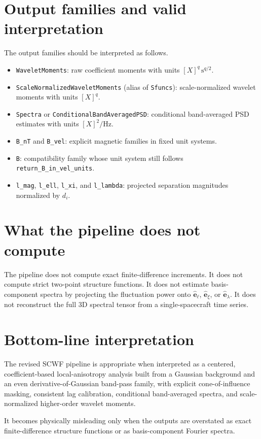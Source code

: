 \documentclass[11pt]{article}
\begin{document}
\section{Output families and valid interpretation}

The output families should be interpreted as follows.
\begin{itemize}[leftmargin=1.6em,itemsep=0.35em]
\item \texttt{WaveletMoments}: raw coefficient moments with units $[X]^q\,\mathrm{s}^{q/2}$.
\item \texttt{ScaleNormalizedWaveletMoments} (alias of \texttt{Sfuncs}): scale-normalized wavelet moments with units $[X]^q$.
\item \texttt{Spectra} or \texttt{ConditionalBandAveragedPSD}: conditional band-averaged PSD estimates with units $[X]^2/\mathrm{Hz}$.
\item \texttt{B\_nT} and \texttt{B\_vel}: explicit magnetic families in fixed unit systems.
\item \texttt{B}: compatibility family whose unit system still follows \texttt{return\_B\_in\_vel\_units}.
\item \texttt{l\_mag}, \texttt{l\_ell}, \texttt{l\_xi}, and \texttt{l\_lambda}: projected separation magnitudes normalized by $d_i$.
\end{itemize}

\section{What the pipeline does not compute}

The pipeline does not compute exact finite-difference increments. It does not compute
strict two-point structure functions. It does not estimate basis-component spectra by
projecting the fluctuation power onto $\hat{\mathbf{e}}_{\ell}$, $\hat{\mathbf{e}}_{\xi}$,
or $\hat{\mathbf{e}}_{\lambda}$. It does not reconstruct the full 3D spectral tensor
from a single-spacecraft time series.

\section{Bottom-line interpretation}

The revised SCWF pipeline is appropriate when interpreted as a centered,
coefficient-based local-anisotropy analysis built from a Gaussian background and an
even derivative-of-Gaussian band-pass family, with explicit cone-of-influence
masking, consistent lag calibration, conditional band-averaged spectra, and
scale-normalized higher-order wavelet moments.

It becomes physically misleading only when the outputs are overstated as exact
finite-difference structure functions or as basis-component Fourier spectra.
\end{document}
